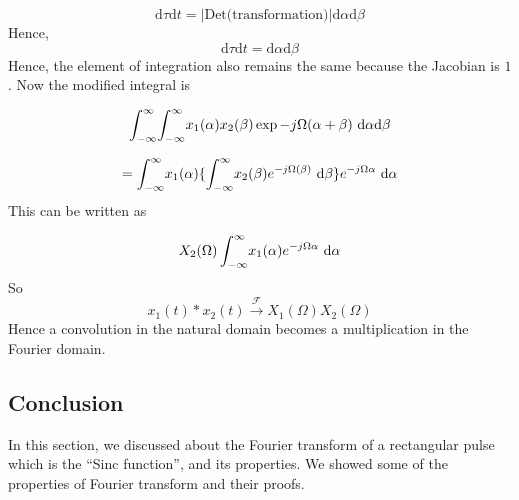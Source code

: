 		\begin{equation}
			\mathrm{d}\tau \mathrm{d}t = |\text{Det(transformation)}| \mathrm{d}\alpha \mathrm{d}\beta
		\end{equation}
		\noindent
		Hence,
		\begin{equation}
			\mathrm{d}\tau \mathrm{d}t = \mathrm{d}\alpha \mathrm{d}\beta
		\end{equation}
		Hence, the element of integration also remains the same because the Jacobian is $1$. Now the modified integral is
		
		\begin{equation}
			\int_{-\infty}^{\infty} \! \int_{-\infty}^{\infty} \! x_1(\alpha) x_2(\beta) \exp{-j\Omega(\alpha+\beta)} \ \mathrm{d} \alpha \mathrm{d} \beta
		\end{equation}
		
		\begin{equation}
			=\int_{-\infty}^{\infty} \! x_1(\alpha) \{ \int_{-\infty}^{\infty} \!
			x_2(\beta) e^{-j\Omega(\beta)} \ \mathrm{d} \beta \} e^{-j\Omega \alpha} \ \mathrm{d} \alpha
		\end{equation}
		This can be written as
		
		\begin{equation}
			X_2(\Omega) \int_{-\infty}^{\infty} \! x_1(\alpha) e^{-j\Omega \alpha} \ \mathrm{d} \alpha
		\end{equation}
		So
		\begin{equation}
			x_1(t) \ast x_2(t) \xrightarrow{\mathcal{F}} X_1(\Omega)X_2(\Omega)
		\end{equation}
		\noindent
		Hence a convolution in the natural domain becomes a multiplication in the Fourier domain.

\subsection {Conclusion} In this section, we discussed about the Fourier transform of a rectangular pulse which is the ``Sinc function'', and its properties. We showed some of the properties of Fourier transform and their proofs.